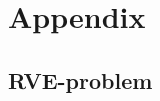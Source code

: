 \documentclass[12pt,a4paper,fleqn]{article}
\renewcommand{\ta}[1]{\mathbfit{#1}}
\renewcommand{\ts}[1]{\mathbfit{#1}}
\begin{document}
%
%

%
\printbibliography

\appendix
\section{Appendix}
\subsection{RVE-problem}
\end{document}

